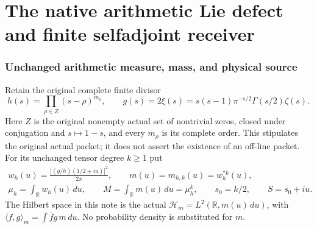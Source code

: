 \endgroup

\clearpage\begingroup
\part*{The native arithmetic Lie defect and finite selfadjoint receiver}
\newtheorem{swlietheorem}{Theorem}[section]
\newtheorem{swlieproposition}[swlietheorem]{Proposition}
\newtheorem{swlielemma}[swlietheorem]{Lemma}
\newtheorem{swliecorollary}[swlietheorem]{Corollary}
\newcommand{\swlieC}{\mathbb C}\newcommand{\swlieR}{\mathbb R}
\newcommand{\swliePP}{\mathcal P}\newcommand{\swlieHH}{\mathcal H}
\newcommand{\swlieB}{\mathscr B}\newcommand{\swlieM}{\mathcal M}
\newcommand{\swlienorm}[1]{\left\lVert#1\right\rVert}
\newcommand{\swlieac}[2]{\{#1,#2\}}


\section{Unchanged arithmetic measure, mass, and physical source}

Retain the original complete finite divisor
\[
 h(s)=\prod_{\rho\in Z}(s-\rho)^{m_\rho},\qquad
 g(s)=2\xi(s)=s(s-1)\pi^{-s/2}\Gamma(s/2)\zeta(s).
\]
Here $Z$ is the original nonempty actual set of nontrivial zeros,
closed under conjugation and $s\mapsto1-s$, and every $m_\rho$
is its complete order. This stipulates the original actual packet;
it does not assert the existence of an off-line packet. For its
unchanged tensor degree $k\geq1$ put
\begin{equation}\label{swlie:eq:measure}
 \begin{gathered}
 w_h(u)=\frac{|(g/h)(1/2+iu)|^2}{2\pi},\qquad
 m(u)=m_{h,k}(u)=w_h^{*k}(u),\\
 \mu_h=\int_\swlieR w_h(u)\,du,\qquad
 M=\int_\swlieR m(u)\,du=\mu_h^k,\qquad s_0=k/2,\qquad S=s_0+iu.
 \end{gathered}
\end{equation}
The Hilbert space in this note is the actual
$\swlieHH_m=L^2(\swlieR,m(u)\,du)$, with
$\langle f,g\rangle_m=\int\overline f g\,m\,du$.
No probability density is substituted for $m$.

